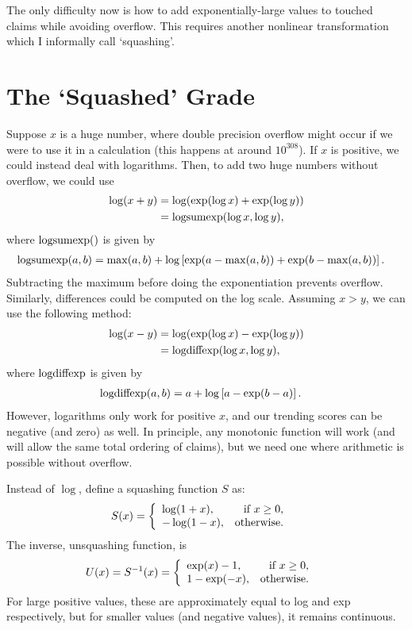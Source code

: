 \documentclass[a4paper, 12pt]{article}
\newcommand{\logsumexp}{\textnormal{logsumexp}}
\newcommand{\logdiffexp}{\textnormal{logdiffexp}}
\begin{document}
The only difficulty now is how to add exponentially-large values to touched
claims while avoiding overflow. This requires another nonlinear transformation
which I informally call `squashing'.

\section{The `Squashed' Grade}
Suppose $x$ is a huge number, where double precision overflow might occur if
we were to use it in a calculation (this happens at around $10^{308}$).
If $x$ is positive, we could instead deal with logarithms. Then, to add
two huge numbers without overflow, we could use
\begin{align}
\log(x + y)  &= \log(\exp(\log x) + \exp(\log y)) \\
             &= \logsumexp(\log x, \log y),
\end{align}
where $\logsumexp()$ is given by
\begin{align}
\logsumexp(a, b) &= \max(a, b)
        + \log\left[\exp(a - \max(a, b)) + \exp(b - \max(a, b))\right].
\end{align}
Subtracting the maximum before doing the exponentiation prevents overflow.
Similarly, differences could be computed on the log scale. Assuming $x>y$,
we can use the following method:
\begin{align}
\log(x - y)  &= \log(\exp(\log x) - \exp(\log y)) \\
             &= \logdiffexp(\log x, \log y),
\end{align}
where $\logdiffexp$ is given by
\begin{align}
\logdiffexp(a, b) &= a
        + \log\left[a - \exp(b-a)\right].
\end{align}
However,
logarithms only work for positive $x$, and our trending scores can be
negative (and zero) as well. In principle, any monotonic function will work
(and will allow the same total ordering of claims),
but we need one where arithmetic is possible without overflow.

Instead of $\log$, define a squashing function $S$ as:
\begin{align}
S(x) &=
    \left\{
        \begin{array}{lr}
            \log (1 + x), & \textnormal{if } x \geq 0, \\
            -\log(1 - x), & \textnormal{otherwise}.
        \end{array}
    \right.
\end{align}
The inverse, unsquashing function, is
\begin{align}
U(x) = S^{-1}(x) &=
    \left\{
        \begin{array}{lr}
            \exp(x) - 1,  & \textnormal{if } x \geq 0, \\
            1 - \exp(-x), & \textnormal{otherwise}.
        \end{array}
    \right.
\end{align}
For large positive values, these are approximately equal to log and exp
respectively, but for smaller values (and negative values), it remains
continuous.
\end{document}
